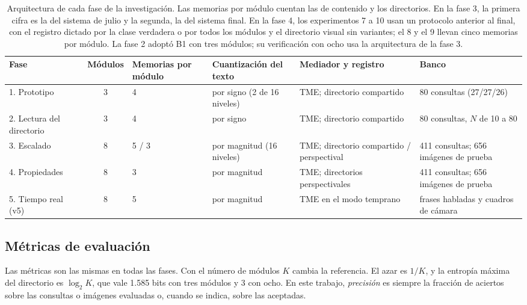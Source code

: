 \begin{table}[H]
\centering
\caption[Arquitectura de cada fase de la investigación]{Arquitectura de cada fase de
la investigación.
Las memorias por módulo cuentan las de contenido y los directorios.
En la fase 3, la primera cifra es la del sistema de julio y la segunda, la del sistema
final.
En la fase 4, los experimentos 7 a 10 usan un protocolo anterior al final, con el
registro dictado por la clase verdadera o por todos los módulos y el directorio visual
sin variantes; el 8 y el 9 llevan cinco memorias por módulo.
La fase 2 adoptó B1 con tres módulos; su verificación con ocho usa la arquitectura de
la fase 3.}
\label{fase:tab-arco}
\footnotesize
\setlength{\tabcolsep}{3pt}
\begin{tabular}{@{}p{2.3cm}cp{1.6cm}p{2.2cm}p{3.6cm}p{2.6cm}@{}}
\toprule
Fase & Módulos & Memorias por módulo & Cuantización del texto & Mediador y registro &
Banco \\
\midrule
1. Prototipo & 3 & 4 & por signo (2 de 16 niveles) & TME; directorio compartido &
80 consultas (27/27/26) \\
2. Lectura del directorio & 3 & 4 & por signo & TME; directorio compartido &
80 consultas, $N$ de 10 a 80 \\
3. Escalado & 8 & 5 / 3 & por magnitud (16 niveles) &
TME; directorio compartido / perspectival & 411 consultas; 656 imágenes de prueba \\
4. Propiedades & 8 & 3 & por magnitud & TME; directorios perspectivales &
411 consultas; 656 imágenes de prueba \\
5. Tiempo real (v5) & 8 & 5 & por magnitud & TME en el modo temprano &
frases habladas y cuadros de cámara \\
\bottomrule
\end{tabular}
\end{table}

\subsection{Métricas de evaluación}
\label{sec:metricas}

Las métricas son las mismas en todas las fases.
Con el número de módulos $K$ cambia la referencia.
El azar es $1/K$, y la entropía máxima del directorio es $\log_2 K$, que vale 1.585 bits
con tres módulos y 3 con ocho.
En este trabajo, \emph{precisión} es siempre la fracción de aciertos sobre las consultas
o imágenes evaluadas o, cuando se indica, sobre las aceptadas.

